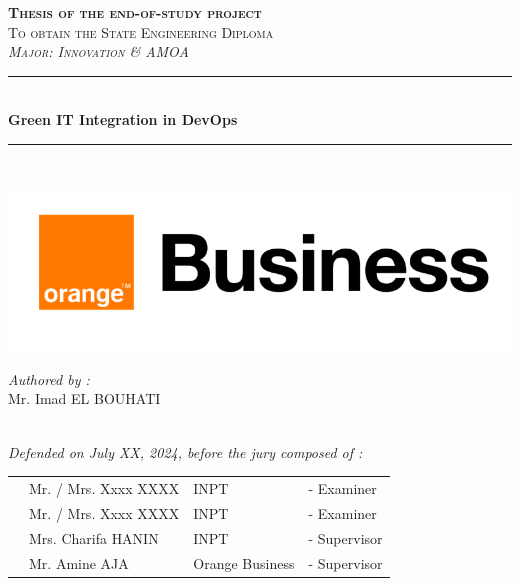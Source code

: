 \vspace{0.9cm}
\begin{center}
{\large \textsc{\textbf{Thesis of the end-of-study project}}}\\[0.1cm]
{\large \textsc{To obtain the State Engineering Diploma}}\\[0.1cm]
{\large \textsc{\textit{Major: Innovation \& AMOA}}} \\[0.05cm] 
\vspace{-0.04cm}
\rule{\linewidth}{0.3mm} \\[0.4cm]   %
 { \huge \textbf{ Green IT Integration in DevOps }} \\[0.15cm] 
\rule{\linewidth}{0.3mm} \\[0.4cm]
\vspace{0.4cm}

\includegraphics[scale=0.28]{Logos/ob.png}  %

\vspace{1cm}

\noindent
\begin{minipage}{0.9\textwidth}
    \vspace{-7mm}
  \begin{flushleft} \large
    \emph{Authored by :}\\
    Mr. Imad \textsc{EL BOUHATI} %
  \end{flushleft}
\end{minipage}
\begin{minipage}{0.4\textwidth}

\end{minipage}\\[0.6cm]

{\large \textit{Defended on July XX, 2024, before the jury composed of :}}\\[0.5cm]


\begin{tabular}{p{1cm}lll}
 & \large Mr. / Mrs. Xxxx \textsc{XXXX}  & \large INPT & \large - Examiner \\[0.1cm]
 & \large Mr. / Mrs. Xxxx \textsc{XXXX}  & \large INPT & \large - Examiner \\[0.1cm]
 & \large Mrs. Charifa \textsc{HANIN}  & \large INPT & \large - Supervisor \\[0.1cm]
  & \large Mr. Amine \textsc{AJA}  & \large Orange Business & \large - Supervisor \\[0.1cm]
 

\end{tabular}
\end{center}
